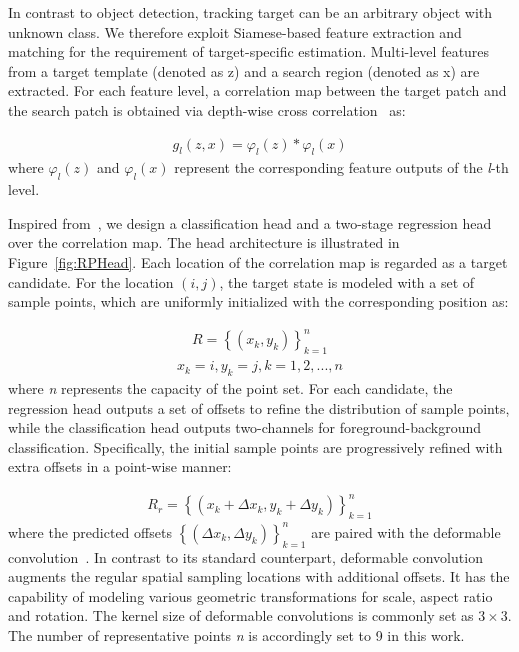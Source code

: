 \documentclass[runningheads]{llncs}
\begin{document}
In contrast to object detection, tracking target can be an arbitrary object with unknown class. We therefore exploit Siamese-based feature extraction and matching for the requirement of target-specific estimation. Multi-level features from a target template (denoted as z)
and a search region (denoted as x) are extracted. For each feature level, a correlation map between the target patch and the search patch
is obtained via depth-wise cross correlation~\cite{siamrpn++} as:

\begin{align}
g_{l}\left( z,x \right) = \varphi_{l}\left( z \right)*\varphi_{l}\left( x \right)
\end{align}
where $\varphi_{l}\left( z \right)$ and $\varphi_{l}\left( x \right)$
represent the corresponding feature outputs of the \emph{l}-th level.

Inspired from~\cite{reppoints}, we design a classification head and a two-stage
regression head over the correlation map. The head architecture is illustrated in Figure~\ref{fig:RPHead}.
Each location of the correlation map is regarded as a target candidate. For the location $\left(i,j\right)$, the target state is modeled with a set of sample points, which are
uniformly initialized with the corresponding position as:


\begin{align}
R = \left\{ \left( x_{k},y_{k} \right) \right\}_{k = 1}^{n}
\end{align}
\begin{align}
x_{k} = i, y_{k} = j, k = 1,2,...,n
\end{align}
where \emph{n} represents the capacity of the point set. For each candidate, the regression head outputs a set of offsets to refine the
distribution of sample points, while the classification head
outputs two-channels for foreground-background classification. Specifically, the initial sample points are progressively refined
with extra offsets in a point-wise manner:

\begin{align}
R_{r} = \left\{ \left( x_{k} +\Delta x_{k},y_{k} +\Delta y_{k} \right) \right\}_{k = 1}^{n}
\end{align}
where the predicted offsets
$\left\{ \left( \Delta {x}_{k},\Delta {y}_{k} \right) \right\}_{k = 1}^{n}$
are paired with the deformable convolution~\cite{Dconv}. In contrast to
its standard counterpart, deformable convolution augments the regular
spatial sampling locations with additional offsets. It has the
capability of modeling various geometric transformations for scale,
aspect ratio and rotation. The kernel size of deformable convolutions is commonly set as $3\times3$. The number of representative points \emph{n} is accordingly set to 9 in this work.
\end{document}
